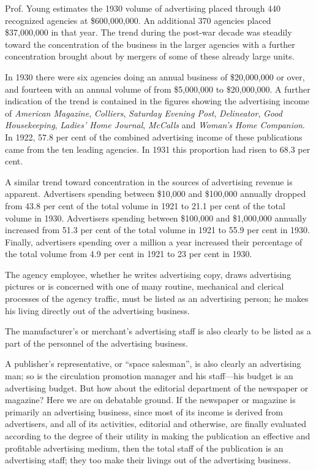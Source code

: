 \documentclass[twoside,nohyper,openany,nobib]{tufte-book}
\begin{document}
Prof. Young estimates the 1930 volume of advertising placed through 440
recognized agencies at \$600,000,000. An additional 370 agencies placed
\$37,000,000 in that year. The trend during the post-war decade was
steadily toward the concentration of the business in the larger agencies
with a further concentration brought about by mergers of some of these
already large units.

In 1930 there were six agencies doing an annual business of \$20,000,000
or over, and fourteen with an annual volume of from \$5,000,000 to
\$20,000,000. A further indication of the trend is contained in the
figures showing the advertising income of \emph{American Magazine},
\emph{Colliers}, \emph{Saturday Evening Post}, \emph{Delineator},
\emph{Good Housekeeping}, \emph{Ladies' Home Journal}, \emph{McCalls}
and \emph{Woman's Home Companion}. In 1922, 57.8 per cent of the
combined advertising income of these publications came from the ten
leading agencies. In 1931 this proportion had risen to 68.3 per cent.

A similar trend toward concentration in the sources of advertising
revenue is apparent. Advertisers spending between \$10,000 and \$100,000
annually dropped from 43.8 per cent of the total volume in 1921 to 21.1
per cent of the total volume in 1930. Advertisers spending between
\$100,000 and \$1,000,000 annually increased from 51.3 per cent of the
total volume in 1921 to 55.9 per cent in 1930. Finally, advertisers
spending over a million a year increased their percentage of the total
volume from 4.9 per cent in 1921 to 23 per cent in 1930.

The agency employee, whether he writes advertising copy, draws
advertising pictures or is concerned with one of many routine,
mechanical and clerical processes of the agency traffic, must be listed
as an advertising person; he makes his living directly out of the
advertising business.

The manufacturer's or merchant's advertising staff is also clearly to be
listed as a part of the personnel of the advertising business.

A publisher's representative, or ``space salesman'', is also clearly an
advertising man; so is the circulation promotion manager and his
staff---his budget is an advertising budget. But how about the editorial
department of the newspaper or magazine? Here we are on debatable
ground. If the newspaper or magazine is primarily an advertising
business, since most of its income is derived from advertisers, and all
of its activities, editorial and otherwise, are finally evaluated
according to the degree of their utility in making the publication an
effective and profitable advertising medium, then the total staff of the
publication is an advertising staff; they too make their livings out of
the advertising business.
\end{document}
